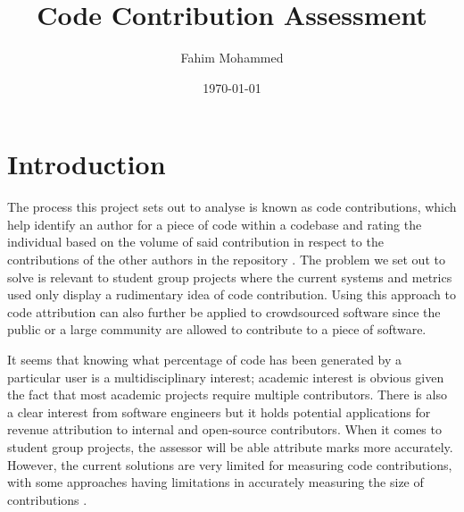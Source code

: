 \documentclass[11pt]{informatics-report}
\title{Code Contribution Assessment}
\author{Fahim Mohammed}
\date{\today}
\begin{document}
\createFrontMatter
\onehalfspacing
\tableofcontents
\doublespacing


\chapter{Introduction}
The process this project sets out to analyse is known as code contributions, which help identify an author for a piece of code within a codebase and rating the individual based on the volume of said contribution in respect to the contributions of the other authors in the repository \citep{10.1007/s10664-017-9575-4}. The problem we set out to solve is relevant to student group projects where the current systems and metrics used only display a rudimentary idea of code contribution. Using this approach to code attribution can also further be applied to crowdsourced software since the public or a large community are allowed to contribute to a piece of software.

It seems that knowing what percentage of code has been generated by a particular user is a multidisciplinary interest; academic interest \citep{kilgour_gray_sallis_macdonell_2012} is obvious given the fact that most academic projects require multiple contributors. There is also a clear interest from software engineers \citep{linares-vasquez_hossen_dang_kagdi_gethers_poshyvanyk_2012} but it holds potential applications for revenue attribution to internal and open-source contributors. When it comes to student group projects, the assessor will be able attribute marks more accurately. However, the current solutions are very limited for measuring code contributions, with some approaches having limitations in accurately measuring the size of contributions \citep{git-author_2013}.
\end{document}
